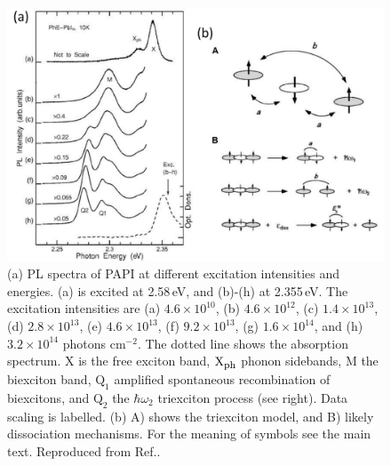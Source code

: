 \begin{figure}[h!]
\centering
\includegraphics[width=\textwidth]{Fig16}
\caption{(a) PL spectra of PAPI at different excitation intensities and energies. (a) is excited at 2.58\,eV, and (b)-(h) at 2.355\,eV. The excitation intensities are (a) $4.6\times 10^{10}$, (b) $4.6\times 10^{12}$, (c) $1.4\times 10^{13}$, (d) $2.8\times 10^{13}$, (e) $4.6\times 10^{13}$, (f) $9.2\times 10^{13}$, (g) $1.6\times 10^{14}$, and (h) $3.2\times 10^{14}$ photons c$\textrm{m}^{-2}$. The dotted line shows the absorption spectrum. X is the free exciton band, $\textrm{X}_{\textrm{\footnotesize ph}}$ phonon sidebands, M the biexciton band, $\textrm{Q}_1$ amplified spontaneous recombination of biexcitons, and $\textrm{Q}_2$ the $\hbar \omega_2$ triexciton process (see right). Data scaling is labelled. (b) A) shows the triexciton model, and B) likely dissociation mechanisms. For the meaning of symbols see the main text. Reproduced from Ref.\!.}
\label{2Fig16}
\end{figure}


